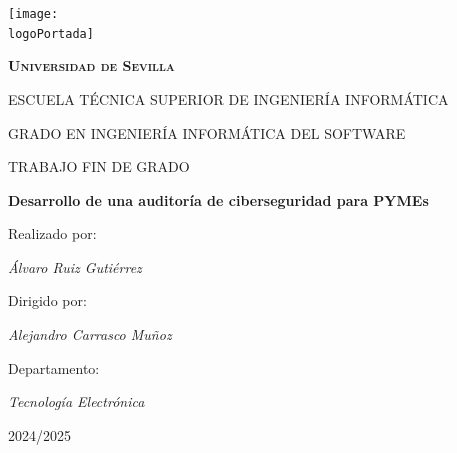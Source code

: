 \documentclass[a4paper, 10pt]{article}
\newcommand{\logoPortada}{images/logo_uni.png}
\begin{document}
    \begin{titlepage}
        \centering
        \texttt{[image: \\logoPortada]} \par\vspace{1cm}
        {\scshape\LARGE \textbf{Universidad de Sevilla}}\par\vspace{1cm}
        {\scshape\Large ESCUELA TÉCNICA SUPERIOR DE INGENIERÍA INFORMÁTICA}\par\vspace{1cm}
        GRADO EN INGENIERÍA INFORMÁTICA DEL SOFTWARE\par\vspace{1cm}
        TRABAJO FIN DE GRADO\par\vspace{1cm}
        {\huge\bfseries Desarrollo de una auditoría de ciberseguridad para PYMEs}\par\vspace{1cm}
        Realizado por:\par\vspace{0.1cm}
        {\Large\itshape Álvaro Ruiz Gutiérrez}\par\vspace{1cm}
        Dirigido por:\par\vspace{0.1cm}
        {\Large\itshape Alejandro Carrasco Muñoz}\par\vspace{1cm}
        Departamento:\par\vspace{0.1cm}
        {\Large\itshape Tecnología Electrónica}\par\vspace{1cm}
        2024/2025
    \end{titlepage}
    \clearpage

\tableofcontents
\thispagestyle{empty}
\clearpage


\listoffigures
\thispagestyle{empty}
\clearpage


\listoftables
\thispagestyle{empty}
\clearpage


\end{document}
